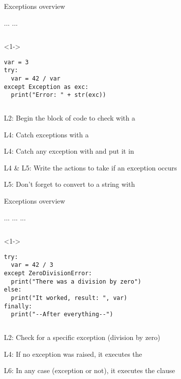 
\begin{frame}[fragile]{Exceptions overview}

   ...  ...

  \begin{columns}[onlytextwidth]
    \begin{column}{\textwidth}
      \begin{onlyenv}<1->
        \begin{lstlisting}[style=python,morekeywords={as}]
var = 3
try:
  var = 42 / var
except Exception as exc:
  print("Error: " + str(exc)) \end{lstlisting}
      \end{onlyenv}
    \end{column}
  \end{columns}

   L2: Begin the block of code to check with a 

   L4: Catch exceptions with a 

   L4: Catch any exception with  and put it in 

   L4 \& L5: Write the actions to take if an exception occurs

   L5: Don't forget to convert to a string with 

\end{frame}


\begin{frame}[fragile]{Exceptions overview}

   ...  ...  ... 

  \begin{columns}[onlytextwidth]
    \begin{column}{\textwidth}
      \begin{onlyenv}<1->
        \begin{lstlisting}[style=python,morekeywords={as}]
try:
  var = 42 / 3
except ZeroDivisionError:
  print("There was a division by zero")
else:
  print("It worked, result: ", var)
finally:
  print("--After everything--")\end{lstlisting}
      \end{onlyenv}
    \end{column}
  \end{columns}

   L2: Check for a specific exception (division by zero)

   L4: If no exception was raised, it executes the 

   L6: In any case (exception or not), it executes the  clause

\end{frame}


